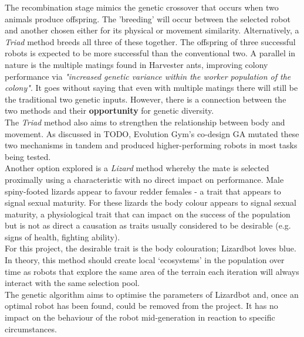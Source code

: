 \documentclass{article}
\begin{document}
The recombination stage mimics the genetic crossover that occurs when two animals produce offspring. The 'breeding' will occur between the selected robot and another chosen either for its physical or movement similarity. Alternatively, a \textit{Triad} method breeds all three of these together. The offspring of three successful robots is expected to be more successful than the conventional two. A parallel in nature is the multiple matings found in Harvester ants, improving colony performance via \textit{"increased genetic variance within the worker population of the colony"}.  It goes without saying that even with multiple matings there will still be the traditional two genetic inputs. However, there is a connection between the two methods and their \textbf{opportunity} for genetic diversity. \\
The \textit{Triad} method also aims to strengthen the relationship between body and movement. As discussed in TODO, Evolution Gym's co-design GA mutated these two mechanisms in tandem and produced higher-performing robots in most tasks being tested. \\

Another option explored is a \textit{Lizard} method whereby the mate is selected proximally using a characteristic with no direct impact on performance. Male spiny-footed lizards appear to favour redder females - a trait that appears to signal sexual maturity.   For these lizards the body colour appears to signal sexual maturity, a physiological trait that can impact on the success of the population but is not as direct a causation as traits usually considered to be desirable (e.g. signs of health, fighting ability). \\
For this project, the desirable trait is the body colouration; Lizardbot loves blue. In theory, this method should create local ‘ecosystems’ in the population over time as robots that explore the same area of the terrain each iteration will always interact with the same selection pool. \\

The genetic algorithm aims to optimise the parameters of Lizardbot and, once an optimal robot has been found, could be removed from the project. It has no impact on the behaviour of the robot mid-generation in reaction to specific circumstances.\\
\end{document}
